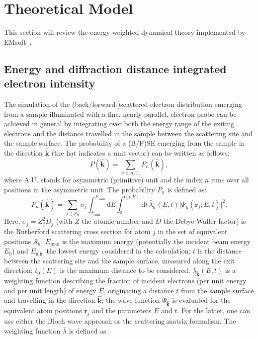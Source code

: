 \section{Theoretical Model}
\label{sec:TKDtheory}

This section will review the energy weighted dynamical theory implemented by EMsoft~\cite{EMsoft}.

%
\subsection{Energy and diffraction distance integrated electron intensity}
\label{sec:energy_weight}


The simulation of the (back/forward-)scattered electron distribution emerging from a sample illuminated with a fine, nearly-parallel, electron probe can be achieved in general by integrating over both the energy range of the exiting electrons and the distance travelled in the sample between the scattering site and the sample surface. The probability of a (B/F)SE emerging from the sample in the direction $\hat{\mathbf{k}}$ (the hat indicates a unit vector) can be written as follows:
\begin{equation}
    P(\hat{\mathbf{k}}) = \sum_{n\in\text{A.U.}} P_n(\hat{\mathbf{k}}),
\end{equation}
where A.U. stands for asymmetric (primitive) unit and the index $n$ runs over all positions in the asymmetric unit.  The probability $P_n$ is defined as:
\begin{equation}
    P_n(\hat{\mathbf{k}}) = \sum_{j\in \mathcal{S}_n}\sigma_j\int_{E_{\text{min}}}^{E_{\text{max}}}\!\!\!\!\mathrm{d}E
    \int_0^{t_0(E)}\!\!\!\!\!\!\mathrm{d}t\, \bar{\lambda}_{\hat{\mathbf{k}}}(E,t)\vert\Psi_{\hat{\mathbf{k}}}(\mathbf{r}_j;E,t)\vert^2.\label{eq:Pn}
\end{equation}
Here, $\sigma_j=Z^2_j D_j$ (with $Z$ the atomic number and $D$ the Debye-Waller factor) is the Rutherford scattering cross section for atom $j$ in the set of equivalent positions $\mathcal{S}_n$; $E_{\text{max}}$ is the maximum energy (potentially the incident beam energy $E_0$) and $E_{\text{min}}$ the lowest energy considered in the calculation; $t$ is the distance between the scattering site and the sample surface, measured along the exit direction; $t_0(E)$ is the maximum distance to be considered; $\bar{\lambda}_{\hat{\mathbf{k}}}(E,t)$ is a weighting function describing the fraction of incident electrons (per unit energy and per unit length) of energy $E$, originating a distance $t$ from the sample surface and travelling in the direction $\hat{\mathbf{k}}$; the wave function $\Psi_{\hat{\mathbf{k}}}$ is evaluated for the equivalent atom positions $\mathbf{r}_j$ and the parameters $E$ and $t$. For the latter, one can use either the Bloch wave approach or the scattering matrix formalism.  The weighting function $\bar{\lambda}$ is defined as:
